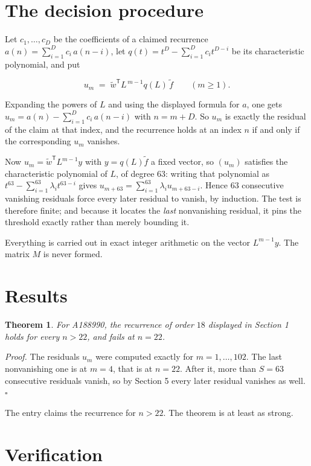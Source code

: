 \documentclass[11pt]{article}
\newtheorem{theorem}{Theorem}
\theoremstyle{definition}
\begin{document}
\section{The decision procedure}

Let $c_1,\dots,c_D$ be the coefficients of a claimed recurrence $a(n) = \sum_{i=1}^{D} c_i\,a(n-i)$, let $q(t) = t^{D} - \sum_{i=1}^{D} c_i t^{D-i}$ be its characteristic polynomial, and put

\[u_m \;=\; \tilde w^{\mathsf T} L^{\,m-1} q(L)\,\tilde f \qquad (m \ge 1).\]

Expanding the powers of $L$ and using the displayed formula for $a$, one gets $u_m = a(n) - \sum_{i=1}^{D} c_i\,a(n-i)$ with $n = m + D$. So $u_m$ is exactly the residual of the claim at that index, and the recurrence holds at an index $n$ if and only if the corresponding $u_m$ vanishes.

Now $u_m = \tilde w^{\mathsf T} L^{m-1} y$ with $y = q(L)\tilde f$ a fixed vector, so $(u_m)$ satisfies the characteristic polynomial of $L$, of degree $63$: writing that polynomial as $t^{63} - \sum_{i=1}^{63} \lambda_i t^{63-i}$ gives $u_{m+63} = \sum_{i=1}^{63} \lambda_i u_{m+63-i}$. Hence $63$ consecutive vanishing residuals force every later residual to vanish, by induction. The test is therefore finite; and because it locates the {\itshape last} nonvanishing residual, it pins the threshold exactly rather than merely bounding it.

Everything is carried out in exact integer arithmetic on the vector $L^{m-1}y$. The matrix $M$ is never formed.

\section{Results}

\begin{theorem} For A188990, the recurrence of order $18$ displayed in Section 1 holds for every $n > 22$, and fails at $n = 22$.\end{theorem}

{\itshape Proof.} The residuals $u_m$ were computed exactly for $m = 1,\dots,102$. The last nonvanishing one is at $m = 4$, that is at $n = 22$. After it, more than $S = 63$ consecutive residuals vanish, so by Section 5 every later residual vanishes as well. $\square$

The entry claims the recurrence for $n > 22$. The theorem is at least as strong.

\section{Verification}
\end{document}
